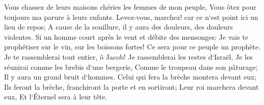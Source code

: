 \verse Vous chassez de leurs maisons chéries les femmes de mon peuple, Vous ôtez pour toujours ma parure à leurs enfants. 
\verse Levez-vous, marchez! car ce n`est point ici un lieu de repos; A cause de la souillure, il y aura des douleurs, des douleurs violentes. 
\verse Si un homme court après le vent et débite des mensonges: Je vais te prophétiser sur le vin, sur les boissons fortes! Ce sera pour ce peuple un prophète. 
\verse Je te rassemblerai tout entier, ô Jacob! Je rassemblerai les restes d`Israël, Je les réunirai comme les brebis d`une bergerie, Comme le troupeau dans son pâturage; Il y aura un grand bruit d`hommes. 
\verse Celui qui fera la brèche montera devant eux; Ils feront la brèche, franchiront la porte et en sortiront; Leur roi marchera devant eux, Et l`Éternel sera à leur tête. 

